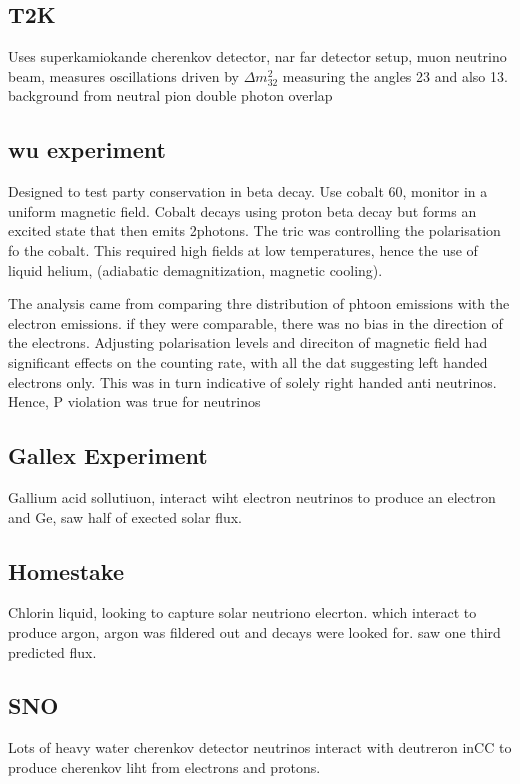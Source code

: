 \documentclass[]{article}
\begin{document}
\subsection{T2K}

Uses superkamiokande cherenkov detector, nar far detector setup, muon neutrino beam, measures oscillations driven by $\Delta m^2_{32}$ measuring the angles 23 and also 13. background from neutral pion double photon overlap


\subsection{wu experiment}

Designed to test party conservation in beta decay. Use cobalt 60, monitor in a uniform magnetic field. Cobalt decays using proton beta decay but forms an excited state that then emits 2photons. The tric was controlling the polarisation fo the cobalt. This required high fields at low temperatures, hence the use of liquid helium, (adiabatic demagnitization, magnetic cooling).

The analysis came from comparing thre distribution of phtoon emissions with the electron emissions. if they were comparable, there was no bias in the direction of the electrons. Adjusting polarisation levels and direciton of magnetic field had significant effects on the counting rate, with all the dat suggesting left handed electrons only. This was in turn indicative of solely right handed anti neutrinos. Hence, P violation was true for neutrinos 

\subsection{Gallex Experiment}

Gallium acid sollutiuon, interact wiht electron neutrinos to produce an electron and Ge, saw half of exected solar flux.

\subsection{Homestake}

Chlorin liquid, looking to capture solar neutriono elecrton. which interact to produce argon, argon was fildered out and decays were looked for. saw one third predicted flux.

\subsection{SNO}
Lots of heavy water cherenkov detector neutrinos interact with deutreron inCC to produce cherenkov liht from electrons and protons. 
\end{document}
